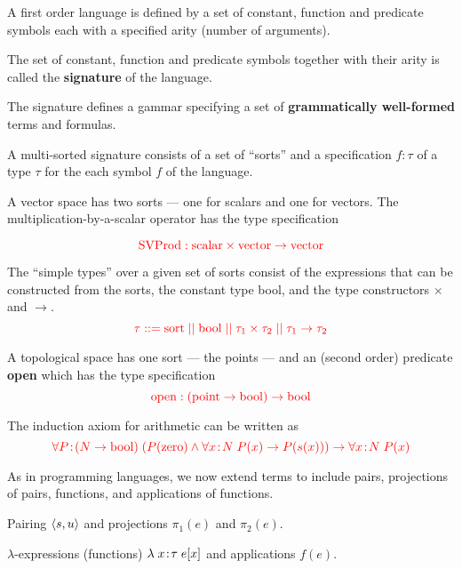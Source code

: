 {

A first order language is defined by a set of constant, function and predicate symbols each with a specified
arity (number of arguments).

\vfill
The set of constant, function and predicate symbols together with their arity is called the {\bf signature} of the language.

\vfill
The signature defines a gammar specifying a set of {\bf grammatically well-formed} terms and formulas.


{\huge
A multi-sorted signature consists of a set of ``sorts'' and a specification $f\!:\!\tau$ of a type $\tau$ for the each symbol $f$ of the language.

\vfill
A vector space has two sorts --- one for scalars and one for vectors.
The multiplication-by-a-scalar operator has the type specification

$${\color{red}\mathrm{SVProd}: \mathrm{scalar} \times \mathrm{vector} \rightarrow \mathrm{vector}}$$
}


The ``simple types'' over a given set of sorts consist of the expressions that can be constructed from the sorts, the constant type bool, and
the type constructors $\times$ and $\rightarrow$.
$${\color{red} \tau ::= \mathrm{sort} \;||\; \mathrm{bool} \;||\; \tau_1 \times \tau_2 \;||\; \tau_1 \rightarrow \tau_2}$$


\vfill
A topological space has one sort --- the points --- and an (second order) predicate {\bf open} which has the type specification
$${\color{red}\mathrm{open}:(\mathrm{point}\rightarrow\mathrm{bool})\rightarrow\mathrm{bool}}$$

\vfill
The induction axiom for arithmetic can be written as
$${\color{red}\forall P\!:\!\left(N\rightarrow\mathrm{bool})\;(P(\mathrm{zero}) \wedge \forall x\!:\!N\;P(x)\rightarrow P(s(x))\right) \rightarrow \forall x\!:\!N \;P(x)}$$


As in programming languages, we now extend terms to include pairs, projections of pairs, functions, and applications of functions.

\vfill
Pairing {\color{red} ${\mbox{$\langle s,u\rangle$}}$} and projections {\color{red} $\pi_1(e)$} and {\color{red} $\pi_2(e)$}.

\vfill
$\lambda$-expressions (functions) {\color{red} $\lambda\; x\!:\!\tau\;e[x]$} and applications {\color{red} $f(e)$}.

}
